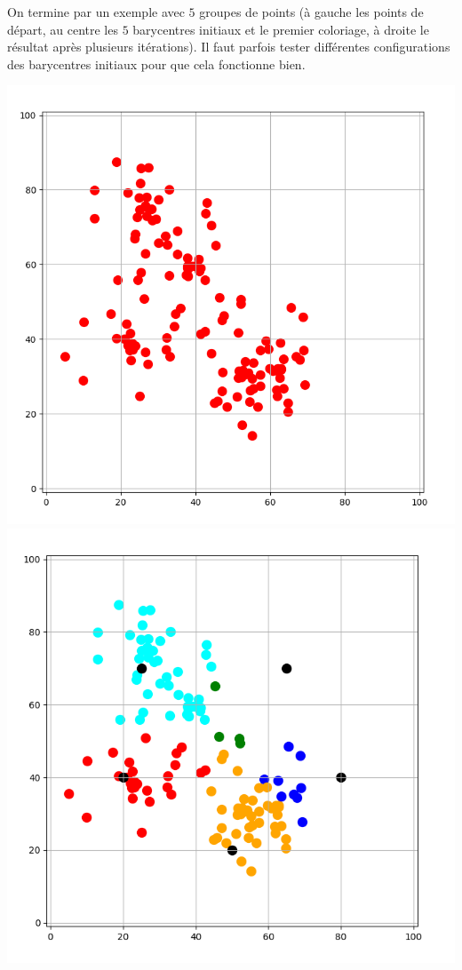 \documentclass[11pt,class=report,crop=false]{standalone}
\begin{document}
\begin{activite}[Barycentres]
On termine par un exemple avec $5$ groupes de points (à gauche les points de départ, au centre les $5$ barycentres initiaux et le premier coloriage, à droite le résultat après plusieurs itérations). Il faut parfois tester différentes configurations des barycentres initiaux pour que cela fonctionne bien.
	\begin{center}
	\includegraphics[scale=\myscale,scale=0.21]{ecran_barycentres_exemple_bis_01}\quad
	\includegraphics[scale=\myscale,scale=0.22]{ecran_barycentres_exemple_bis_02}\quad

\end{center}
\end{activite}
\end{document}
